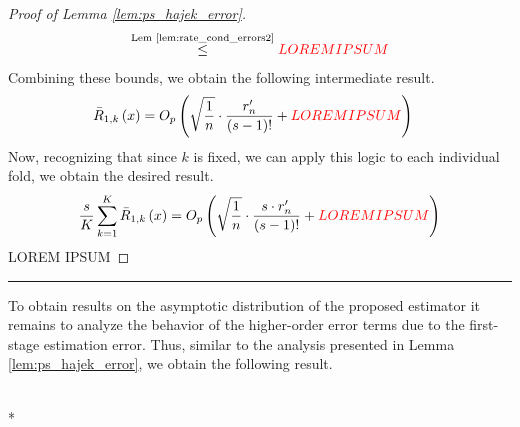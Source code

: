 \begin{proof}[Proof of Lemma \ref{lem:ps_hajek_error}]
\begin{equation}
\begin{aligned}
            \overset{\text{Lem \ref{lem:rate_cond_errors2}}}{\leq} {\color{red} LOREM IPSUM}
        \end{aligned}
    \end{equation}
    Combining these bounds, we obtain the following intermediate result.
    \begin{equation}
        \begin{aligned}
            \bar{R}_{1, k}\left(x\right)
            & = O_{p}\left(\sqrt{\frac{1}{n}} \cdot \frac{r_{n}^{\prime}}{(s-1)!} + {\color{red} LOREM IPSUM}\right)
        \end{aligned}
    \end{equation}
    Now, recognizing that since $k$ is fixed, we can apply this logic to each individual fold, we obtain the desired result.
    \begin{equation}
        \begin{aligned}
            \frac{s}{K} \sum_{k = 1}^{K} \bar{R}_{1, k}\left(x\right) 
            = O_{p}\left(\sqrt{\frac{1}{n}} \cdot \frac{s \cdot r_{n}^{\prime}}{(s-1)!} + {\color{red} LOREM IPSUM}\right)
        \end{aligned}
    \end{equation}
{\color{red} LOREM IPSUM}
\end{proof}

\hrule

To obtain results on the asymptotic distribution of the proposed estimator it remains to analyze the behavior of the higher-order error terms due to the first-stage estimation error.
Thus, similar to the analysis presented in Lemma \ref{lem:ps_hajek_error}, we obtain the following result.

\begin{lem}\label{lem:HO_error}\mbox{}\\*
    
\end{lem}

